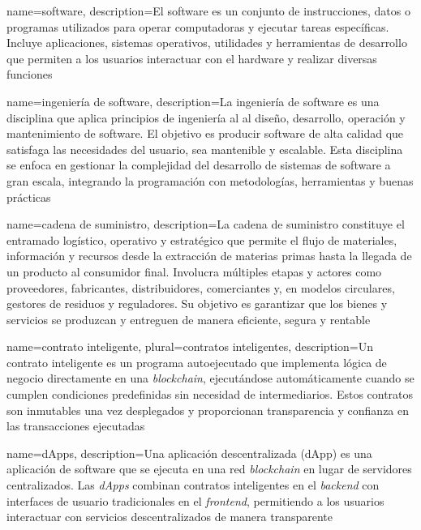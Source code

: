 {
    name=software,
    description={El software es un conjunto de instrucciones, datos o programas utilizados para operar computadoras y ejecutar tareas específicas. Incluye aplicaciones, sistemas operativos, utilidades y herramientas de desarrollo que permiten a los usuarios interactuar con el hardware y realizar diversas funciones}
}


{
    name=ingeniería de software,
    description={La ingeniería de software es una disciplina que aplica principios de ingeniería al al diseño, desarrollo, operación y mantenimiento de software. El objetivo es producir software de alta calidad que satisfaga las necesidades del usuario, sea mantenible y escalable. Esta disciplina se enfoca en gestionar la complejidad del desarrollo de sistemas de software a gran escala, integrando la programación con metodologías, herramientas y buenas prácticas}
}

{
    name=cadena de suministro,
    description={La cadena de suministro constituye el entramado logístico, operativo y estratégico que permite el flujo de materiales, información y recursos desde la extracción de materias primas hasta la llegada de un producto al consumidor final. Involucra múltiples etapas y actores como proveedores, fabricantes, distribuidores, comerciantes y, en modelos circulares, gestores de residuos y reguladores. Su objetivo es garantizar que los bienes y servicios se produzcan y entreguen de manera eficiente, segura y rentable \cite{rodriguez2023modelamiento}}
}

{
    name=contrato inteligente,
    plural=contratos inteligentes,
    description={Un contrato inteligente es un programa autoejecutado que implementa lógica de negocio directamente en una \textit{blockchain}, ejecutándose automáticamente cuando se cumplen condiciones predefinidas sin necesidad de intermediarios. Estos contratos son inmutables una vez desplegados y proporcionan transparencia y confianza en las transacciones ejecutadas \cite{buterin2013ethereum}}
}

{
    name=dApps,
    description={Una aplicación descentralizada (dApp) es una aplicación de software que se ejecuta en una red \textit{blockchain} en lugar de servidores centralizados. Las \textit{dApps} combinan contratos inteligentes en el \textit{backend} con interfaces de usuario tradicionales en el \textit{frontend}, permitiendo a los usuarios interactuar con servicios descentralizados de manera transparente}
}


